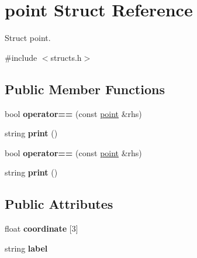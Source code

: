 \hypertarget{structpoint}{}\section{point Struct Reference}
\label{structpoint}


Struct point.  




{\ttfamily \#include $<$structs.\+h$>$}

\subsection*{Public Member Functions}
\begin{DoxyCompactItemize}
\item 
bool {\bfseries operator==} (const \hyperlink{structpoint}{point} \&rhs)\hypertarget{structpoint_ab7d525ec6723f8960ae67505562cc49a}{}\label{structpoint_ab7d525ec6723f8960ae67505562cc49a}

\item 
string {\bfseries print} ()\hypertarget{structpoint_af90e6b5c7b1e845241e8e9a2cdf1b666}{}\label{structpoint_af90e6b5c7b1e845241e8e9a2cdf1b666}

\item 
bool {\bfseries operator==} (const \hyperlink{structpoint}{point} \&rhs)\hypertarget{structpoint_ab7d525ec6723f8960ae67505562cc49a}{}\label{structpoint_ab7d525ec6723f8960ae67505562cc49a}

\item 
string {\bfseries print} ()\hypertarget{structpoint_af90e6b5c7b1e845241e8e9a2cdf1b666}{}\label{structpoint_af90e6b5c7b1e845241e8e9a2cdf1b666}

\end{DoxyCompactItemize}
\subsection*{Public Attributes}
\begin{DoxyCompactItemize}
\item 
float {\bfseries coordinate} \mbox{[}3\mbox{]}\hypertarget{structpoint_a460acc9b7224d448646838f2c92a42b4}{}\label{structpoint_a460acc9b7224d448646838f2c92a42b4}

\item 
string {\bfseries label}\hypertarget{structpoint_aac98b52176e98d5ae6ab04ff1351fb14}{}\label{structpoint_aac98b52176e98d5ae6ab04ff1351fb14}

\end{DoxyCompactItemize}


